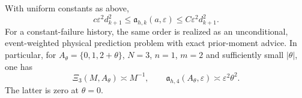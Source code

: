 \begin{corollary}
\label{cor:prefix-ambiguity}
With uniform constants as above,
\begin{equation}\label{eq:prefix-ambiguity-risk}
 c\varepsilon^2d_{k+1}^2
 \le\mathfrak a_{h,k}(a,\varepsilon)
 \le C\varepsilon^2d_{k+1}^2.
\end{equation}
For a constant-failure history, the same order is realized as an
unconditional, event-weighted physical prediction problem with exact
prior-moment advice. In particular, for
$A_\theta=\{0,1,2+\theta\}$, $N=3$, $n=1$, $m=2$ and sufficiently
small $|\theta|$, one has
\begin{equation}\label{eq:invisible-memory-visible-ambiguity}
 \Xi_3(M,A_\theta)\asymp M^{-1},\qquad
 \mathfrak a_{h,4}(A_\theta,\varepsilon)
                            \asymp\varepsilon^2\theta^2.
\end{equation}
The latter is zero at $\theta=0$.
\end{corollary}
